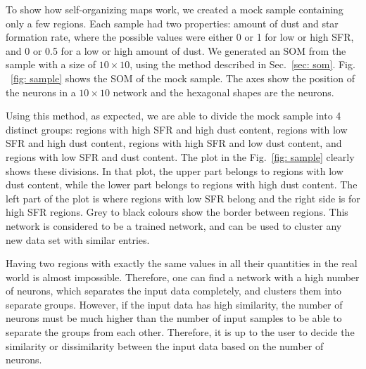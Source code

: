 To show how self-organizing maps work, we created a mock sample containing only a few regions.
Each sample had two properties: amount of dust and star formation rate, where the possible values were
either 0 or 1 for low or high SFR, and 0 or 0.5 for a low or high amount of dust. 
 We generated an SOM from the sample with a size of $10 \times 10$, using the method described in Sec.~\ref{sec: som}.
 Fig. ~\ref{fig: sample} shows the SOM of the mock sample. 
 The axes show the position of the neurons in a $10 \times 10$ network and the hexagonal shapes are the neurons.
 
Using this method, as expected, we are able to divide the mock sample into 4 distinct groups: regions with high SFR and high dust content, regions with low SFR and high dust content, regions with high SFR and low dust content, and regions with low SFR and dust content. 
The plot in the Fig.~\ref{fig: sample} clearly shows these divisions.
In that plot, the upper part belongs to regions with low dust content, while the lower part belongs to regions with high dust content.
The left part of the plot is where regions with low SFR belong and the right side is for high SFR regions.
Grey to black colours show the border between regions.
This network is considered to be a trained network, and can be used to cluster any new data set with similar entries.

Having two regions with exactly the same values in all their quantities in the real world is almost impossible. 
Therefore, one can find a network with a high number of neurons, which separates the input data completely, and clusters them into separate groups.
However, if the input data has high similarity, the number of neurons must be much higher than the number of input samples to be able to separate the groups from each other. 
Therefore, it is up to the user to decide the similarity or dissimilarity between the input data based on the number of neurons.  %
